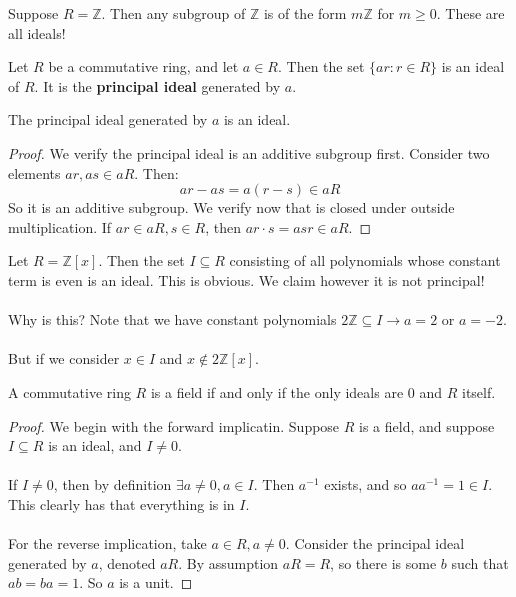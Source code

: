 \documentclass[12pt]{article}
\newenvironment{lemma}[2][Lemma]{\begin{trivlist}
    \item[\hskip \labelsep {\bfseries #1}\hskip \labelsep {\bfseries #2.}]}{\end{trivlist}}
\newenvironment{definition}[2][Definition]{\begin{trivlist}
    \item[\hskip \labelsep {\bfseries #1}\hskip \labelsep {\bfseries #2.}]}{\end{trivlist}}
\newenvironment{example}[1][Example]{\begin{trivlist}
    \item[\hskip \labelsep {\bfseries #1:}]}{\end{trivlist}}
\begin{document}
\begin{example}
    Suppose $R = \mathbb{Z}$. Then any subgroup of $\mathbb{Z}$ is of the form $m\mathbb{Z}$ for $m \geq 0$. These are all ideals!
\end{example}

\begin{definition}{(Principal Ideal)}
    Let $R$ be a commutative ring, and let $a \in R$. Then the set $\{ar : r \in R\}$ is an ideal of $R$. It is the \textbf{principal ideal} generated by $a$.
\end{definition}

\begin{lemma}{6}
    The principal ideal generated by $a$ is an ideal.
    \begin{proof}
        We verify the principal ideal is an additive subgroup first. Consider two elements $ar, as \in aR$. Then:
        $$ar - as = a(r - s) \in aR$$
        So it is an additive subgroup. We verify now that is closed under outside multiplication. If $ar \in aR, s \in R$, then $ar \cdot s = asr \in aR$. 
    \end{proof}
\end{lemma}

\begin{example}
    Let $R = \mathbb{Z}[x]$. Then the set $I \subseteq R$ consisting of all polynomials whose constant term is even is an ideal. This is obvious. We claim however it is not principal! \\ \\
    Why is this? Note that we have constant polynomials $2\mathbb{Z} \subseteq I \rightarrow a = 2$ or $a = -2$. \\ \\
    But if we consider $x \in I$ and $x \notin 2\mathbb{Z}[x]$. 
\end{example}

\begin{lemma}{7}
    A commutative ring $R$ is a field if and only if the only ideals are $0$ and $R$ itself.
    \begin{proof}
        We begin with the forward implicatin. Suppose $R$ is a field, and suppose $I \subseteq R$ is an ideal, and $I \neq 0$. \\ \\
        If $I \neq 0$, then by definition $\exists a \neq 0, a \in I$. Then $a^{-1}$ exists, and so $aa^{-1} = 1 \in I$. This clearly has that everything is in $I$. \\ \\
        For the reverse implication, take $a \in R, a \neq 0$. Consider the principal ideal generated by $a$, denoted $aR$. By assumption $aR = R$, so there is some $b$ such that $ab = ba = 1$. So $a$ is a unit.
    \end{proof}
\end{lemma}
\end{document}
